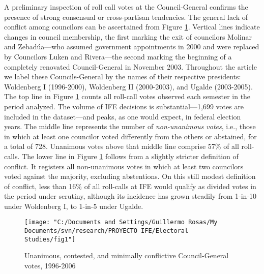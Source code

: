 \documentclass[12 pt, letter]{article}
\begin{document}
A preliminary inspection of roll call votes at the Council-General confirms the presence of strong consensual or cross-partisan tendencies.  The general lack of conflict among councilors can be ascertained from Figure \ref{F:unan}.  Vertical lines indicate changes in council membership, the first marking the exit of councilors Molinar and Zebad\'ua---who assumed government appointments in 2000 and were replaced by Councilors Luken and Rivera---the second marking the beginning of a completely renovated Council-General in November 2003.  Throughout the article we label these Councils-General by the names of their respective presidents: Woldenberg I (1996-2000), Woldenberg II (2000-2003), and Ugalde (2003-2005).  The top line in Figure \ref{F:unan} counts all roll-call votes observed each semester in the period analyzed.  The volume of IFE decisions is substantial---1,699 votes are included in the dataset---and peaks, as one would expect, in federal election years.  The middle line represents the number of \emph{non-unanimous votes}, i.e., those in which at least one councilor voted differently from the others or abstained, for a total of 728.  Unanimous votes above that middle line comprise 57\% of all roll-calls. The lower line in Figure \ref{F:unan} follows from a slightly stricter definition of conflict.  It registers all non-unanimous votes in which at least two councilors voted against the majority, excluding abstentions.  On this still modest definition of conflict, less than 16\% of all roll-calls at IFE would qualify as divided votes in the period under scrutiny, although its incidence has grown steadily from 1-in-10 under Woldenberg I, to 1-in-5 under Ugalde.
\begin{figure}
\begin{center}
\texttt{[image: "C:/Documents and Settings/Guillermo Rosas/My Documents/svn/research/PROYECTO IFE/Electoral Studies/fig1"]}
\caption{Unanimous, contested, and minimally conflictive
Council-General votes, 1996-2006}\label{F:unan}
\end{center}
\end{figure}
\end{document}

